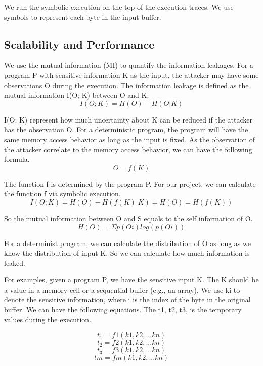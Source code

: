 We run the symbolic execution on the top of the execution traces. We use symbols
to represent each byte in the input buffer. 
\subsection{Scalability and Performance}

We use the mutual information (MI) to quantify the information leakages. 
For a program P with sensitive information K as the input, the attacker may have some observations O during the execution. 
The information leakage is defined as the mutual information I(O; K) between O and K.
\begin{equation}
I(O; K) = H(O) - H(O|K)
\end{equation}

I(O; K) represent how much uncertainty about K can be reduced if the attacker has the observation O.
For a deterministic program, the program will have the same memory access behavior as long as the input is fixed. 
As the observation of the attacker correlate to the memory access behavior, 
we can have the following formula.
\begin{equation}
O = f(K)
\end{equation}

The function f is determined by the program P. For our project, we can calculate the function f via symbolic execution.
\begin{equation}
I(O; K) = H(O) - H(f(K)|K) = H(O) = H(f(K))
\end{equation}

So the mutual information between O and S equals to the self information of O. 
\begin{equation}
H(O) = Σp(Oi)log(p(Oi))
\end{equation}

For a determinist program, we can calculate the distribution of O as long as we know the distribution of input K. 
So we can calculate how much information is leaked.

For examples, given a program P, we have the sensitive input K. The K should be a value in a memory cell or a sequential buffer (e.g., an array). We use ki to denote the sensitive information, where i is the index of the byte in the original buffer.  We can have the following equations. The t1, t2, t3, is the temporary values during the execution.

$$t_1 = f1(k1, k2, ... kn)$$
$$t_2 = f2(k1, k2, ... kn)$$
$$t_3 = f3(k1, k2, ... kn)$$
$$tm = fm(k1, k2, ... kn)$$


